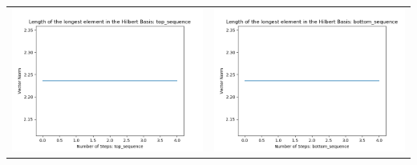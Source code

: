 \documentclass[10pt]{article}
\begin{document}
\begin{tabular}{c|c}
\begin{minipage}{.4\textwidth}
\includegraphics[width=\textwidth]{"DATA/5d/5 generators 1 bound G/top_sequence LENGTH"}
\end{minipage} &
\begin{minipage}{.4\textwidth}
\includegraphics[width=\textwidth]{"DATA/5d/5 generators 1 bound G bottomup/bottom_sequence LENGTH"}
\end{minipage}
\end{tabular}
\end{document}
